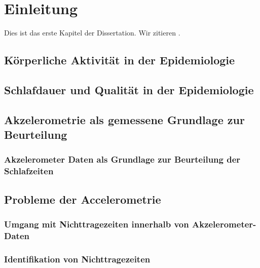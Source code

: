 \chapter{Einleitung}

Dies ist das erste Kapitel der Dissertation. Wir zitieren
\cite{Choi2012}.

\section{Körperliche Aktivität in der Epidemiologie}

\section{Schlafdauer und Qualität in der Epidemiologie}

\section{Akzelerometrie als gemessene Grundlage zur Beurteilung}

\subsection{Akzelerometer Daten als Grundlage zur Beurteilung der Schlafzeiten}

\section{Probleme der Accelerometrie}

\subsection{Umgang mit Nichttragezeiten innerhalb von Akzelerometer-Daten}

\subsection{Identifikation von Nichttragezeiten}





\section{}
